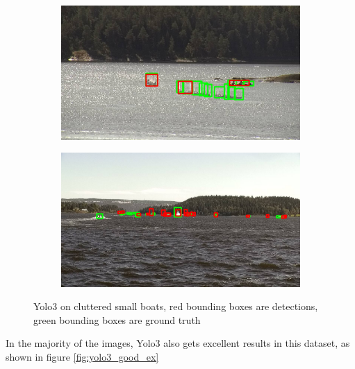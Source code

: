 \begin{figure}[h!]
\begin{subfigure}{.5\textwidth}
  \centering
  \includegraphics[width=0.8\linewidth]{discussion/clutter_yolo3/selected_08_10_frame0130.jpg}
\end{subfigure}%
\begin{subfigure}{.5\textwidth}
  \centering
  \includegraphics[width=.8\linewidth]{discussion/clutter_yolo3/selected_08_11_frame6630.jpg}
\end{subfigure}
\caption{Yolo3 on cluttered small boats, red bounding boxes are detections, green bounding boxes are ground truth}
\label{fig:yolo3_clutter}
\end{figure}

\newpage

In the majority of the images, Yolo3 also gets excellent results in this dataset, as shown in figure \ref{fig:yolo3_good_ex}

